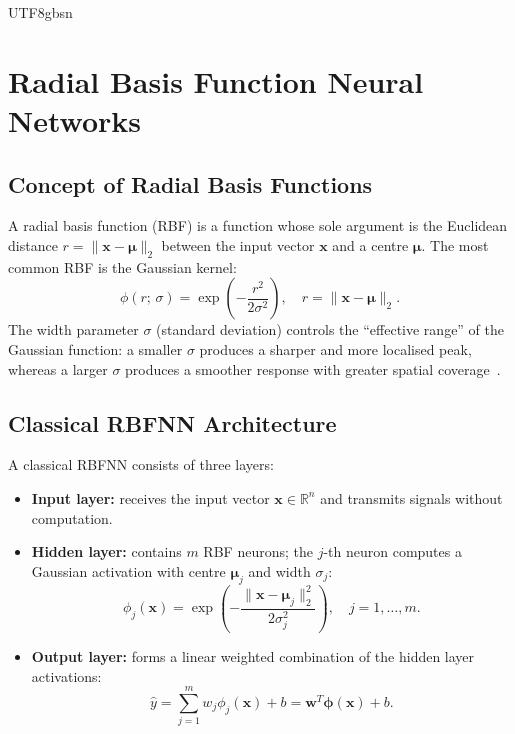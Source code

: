 \documentclass[a4paper,12pt]{report}
\begin{document}
\begin{CJK}{UTF8}{gbsn}
\chapter{Radial Basis Function Neural Networks}
\label{chap:rbfnn}

\section{Concept of Radial Basis Functions}
\label{sec:rbf_concept}

A radial basis function (RBF) is a function whose sole argument is the Euclidean distance
$r = \|\mathbf{x} - \boldsymbol{\mu}\|_2$ between the input vector $\mathbf{x}$ and a
centre $\boldsymbol{\mu}$. The most common RBF is the Gaussian kernel:
\begin{equation}
  \phi(r;\,\sigma) = \exp\!\left(-\frac{r^2}{2\sigma^2}\right), \quad
  r = \|\mathbf{x} - \boldsymbol{\mu}\|_2.
  \label{eq:rbf_gaussian}
\end{equation}
The width parameter $\sigma$ (standard deviation) controls the ``effective range'' of the
Gaussian function: a smaller $\sigma$ produces a sharper and more localised peak, whereas
a larger $\sigma$ produces a smoother response with greater spatial coverage~\cite{park1991rbf}.

\section{Classical RBFNN Architecture}
\label{sec:classical_rbfnn}

A classical RBFNN consists of three layers:
\begin{itemize}
  \item \textbf{Input layer:} receives the input vector $\mathbf{x} \in \mathbb{R}^n$
    and transmits signals without computation.
  \item \textbf{Hidden layer:} contains $m$ RBF neurons; the $j$-th neuron computes a
    Gaussian activation with centre $\boldsymbol{\mu}_j$ and width $\sigma_j$:
    \begin{equation}
      \phi_j(\mathbf{x}) = \exp\!\left(-\frac{\|\mathbf{x}-\boldsymbol{\mu}_j\|_2^2}{2\sigma_j^2}\right),
      \quad j=1,\ldots,m.
      \label{eq:rbf_hidden}
    \end{equation}
  \item \textbf{Output layer:} forms a linear weighted combination of the hidden layer
    activations:
    \begin{equation}
      \hat{y} = \sum_{j=1}^{m} w_j \phi_j(\mathbf{x}) + b = \mathbf{w}^T \boldsymbol{\phi}(\mathbf{x}) + b.
      \label{eq:rbf_output}
    \end{equation}
\end{itemize}


\end{CJK}
\end{document}
